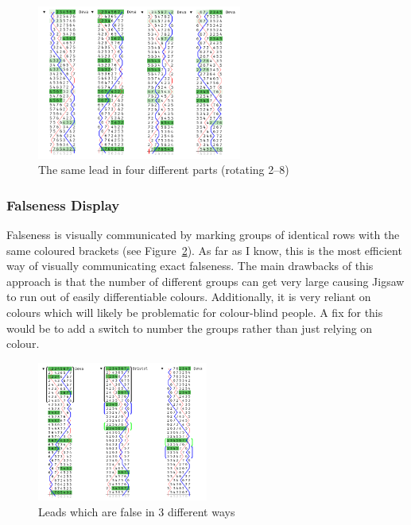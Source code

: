 \documentclass[12pt]{article}
\begin{document}
\begin{figure}
    \centering
    \includegraphics[width=0.6\textwidth]{multi-part-music-clean}
    \caption{The same lead in four different parts (rotating 2--8)}\label{fig:multi-part-music}
\end{figure}

\subsubsection{Falseness Display}

Falseness is visually communicated by marking groups of identical rows with the same coloured
brackets (see Figure~\ref{fig:falseness}).  As far as I know, this is the most efficient way of
visually communicating exact falseness.  The main drawbacks of this approach is that the number of
different groups can get very large causing Jigsaw to run out of easily differentiable colours.
Additionally, it is very reliant on colours which will likely be problematic for colour-blind
people.  A fix for this would be to add a switch to number the groups rather than just relying on
colour.

\begin{figure}
    \centering
    \includegraphics[width=0.5\textwidth]{falseness-clean}
    \caption{Leads which are false in 3 different ways}\label{fig:falseness}
\end{figure}
\end{document}
